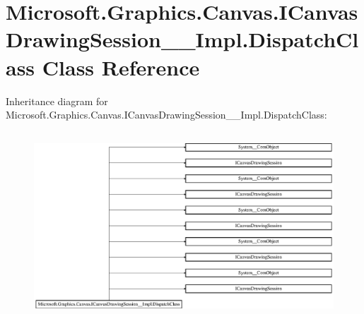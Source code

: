 \hypertarget{class_microsoft_1_1_graphics_1_1_canvas_1_1_i_canvas_drawing_session_____impl_1_1_dispatch_class}{}\section{Microsoft.\+Graphics.\+Canvas.\+I\+Canvas\+Drawing\+Session\+\_\+\+\_\+\+Impl.\+Dispatch\+Class Class Reference}
\label{class_microsoft_1_1_graphics_1_1_canvas_1_1_i_canvas_drawing_session_____impl_1_1_dispatch_class}
Inheritance diagram for Microsoft.\+Graphics.\+Canvas.\+I\+Canvas\+Drawing\+Session\+\_\+\+\_\+\+Impl.\+Dispatch\+Class\+:\begin{figure}[H]
\begin{center}
\leavevmode
\includegraphics[height=7.064220cm]{class_microsoft_1_1_graphics_1_1_canvas_1_1_i_canvas_drawing_session_____impl_1_1_dispatch_class}
\end{center}
\end{figure}
